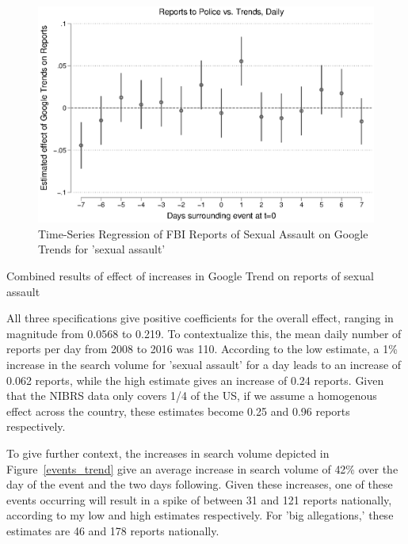 \documentclass[AER,draftmode]{AEA}
\begin{document}
\begin{figure}
\includegraphics[width=\linewidth]{figures/police_trend_daily_logboth.eps}
\caption{Time-Series Regression of FBI Reports of Sexual Assault on Google Trends for 'sexual assault'} \label{figure:police_trends_daily_logboth}
\end{figure}

\begin{table}[]
\caption{Combined results of effect of increases in Google Trend on reports of sexual assault} \label{table:combinedtable}

\end{table}

All three specifications give positive coefficients for the overall effect, ranging in magnitude from 0.0568 to 0.219. To contextualize this, the mean daily number of reports per day from 2008 to 2016 was 110.  According to the low estimate, a 1\% increase in the search volume for 'sexual assault' for a day leads to an increase of 0.062 reports, while the high estimate gives an increase of 0.24 reports. Given that the NIBRS data only covers 1/4 of the US, if we assume a homogenous effect across the country, these estimates become 0.25 and 0.96 reports respectively.

To give further context, the increases in search volume depicted in Figure~\ref{events_trend} give an average increase in search volume of 42\% over the day of the event and the two days following. Given these increases, one of these events occurring will result in a spike of between 31 and 121 reports nationally, according to my low and high estimates respectively.  For 'big allegations,' these estimates are 46 and 178 reports nationally.
\end{document}
